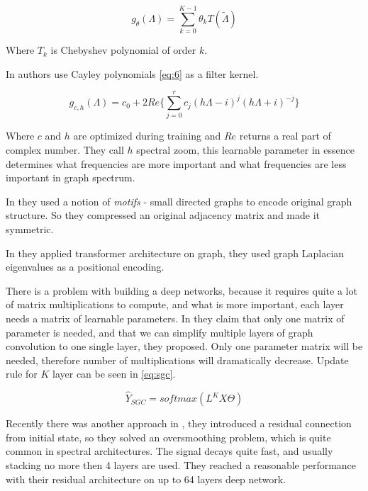 \begin{equation}
    g_\theta(\Lambda)=\sum_{k=0}^{K-1}\theta_kT(\tilde{\Lambda})
    \label{eq:5}
\end{equation}

Where $T_k$ is Chebyshev polynomial of order $k$.

In \cite{Levie_Monti_Bresson_Bronstein_2019} authors use Cayley polynomials \ref{eq:6} as a filter kernel.

\begin{equation}
    g_{c,h}(\Lambda)=c_0+2Re\{\sum_{j=0}^{r}c_j(h\Lambda-i)^j(h\Lambda+i)^{-j}\}
    \label{eq:6}
\end{equation}

Where $c$ and $h$ are optimized during training and $Re$ returns a real part of complex number. They call $h$ spectral zoom, this learnable parameter in essence determines what frequencies are more important and what frequencies are less important in graph spectrum.

In \cite{Monti_Otness_Bronstein_2018} they used a notion of \textit{motifs} - small directed graphs to encode original graph structure. So they compressed an original adjacency matrix and made it symmetric.

In \cite{Dwivedi_Bresson_2020} they applied transformer \cite{Vaswani_Shazeer_Parmar_Uszkoreit_Jones_Gomez_Kaiser_Polosukhin_2017} architecture on graph, they used graph Laplacian eigenvalues as a positional encoding.

There is a problem with building a deep networks, because it requires quite a lot of matrix multiplications to compute, and what is more important, each layer needs a matrix of learnable parameters. In \cite{Wu_Zhang_Souza_Jr_Fifty_Yu_Weinberger_2019} they claim that only one matrix of parameter is needed, and that we can simplify multiple layers of graph convolution to one single layer, they proposed. Only one parameter matrix will be needed, therefore number of multiplications will dramatically decrease. Update rule for $K$ layer can be seen in \ref{eq:sgc}.

\begin{equation}
    \hat{Y}_{SGC}=softmax(L^KX\Theta)
    \label{eq:sgc}
\end{equation}

Recently there was another approach in \cite{Chen_Wei_Huang_Ding_Li_2020}, they introduced a residual connection from initial state, so they solved an oversmoothing problem, which is quite common in spectral architectures. The signal decays quite fast, and usually stacking no more then 4 layers are used. They reached a reasonable performance with their residual architecture on up to 64 layers deep network.

